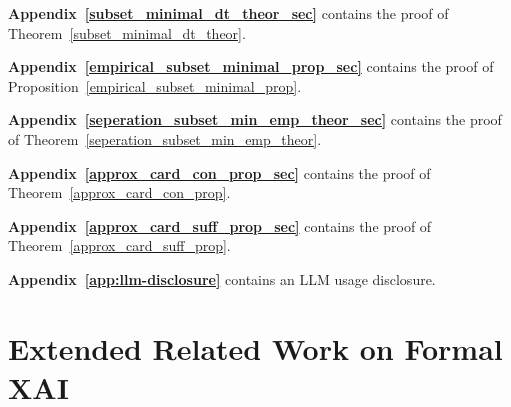 \documentclass{article}
\begin{document}
\begin{MyIndentedList}
\textbf{Appendix~\ref{subset_minimal_dt_theor_sec}} contains the proof of Theorem~\ref{subset_minimal_dt_theor}.


    \item \textbf{Appendix~\ref{empirical_subset_minimal_prop_sec}} contains the proof of Proposition~\ref{empirical_subset_minimal_prop}.


    \item \textbf{Appendix~\ref{seperation_subset_min_emp_theor_sec}} contains the proof of Theorem~\ref{seperation_subset_min_emp_theor}.


        \item \textbf{Appendix~\ref{approx_card_con_prop_sec}} contains the proof of Theorem~\ref{approx_card_con_prop}.


        \item \textbf{Appendix~\ref{approx_card_suff_prop_sec}} contains the proof of Theorem~\ref{approx_card_suff_prop}.

        
        \item \textbf{Appendix~\ref{app:llm-disclosure}} contains an LLM usage disclosure.

\end{MyIndentedList}




\section{Extended Related Work on Formal XAI}
\label{extended_related_work}
\end{document}
